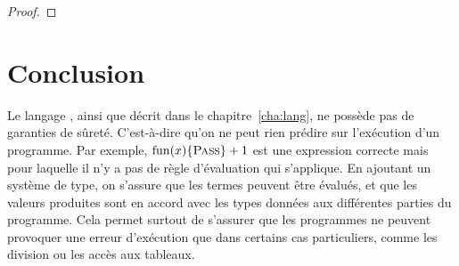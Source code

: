 \begin{proof}
\end{proof}

\section*{Conclusion}

Le langage \langname, ainsi que décrit dans le chapitre~\ref{cha:lang}, ne
possède pas de garanties de sûreté. C'est-à-dire qu'on ne peut rien prédire sur
l'exécution d'un programme. Par exemple, $\mathrm{fun} (x) \{ \textsc{Pass} \} + 1$ est une
expression correcte mais pour laquelle il n'y a pas de règle d'évaluation qui
s'applique. En ajoutant un système de type, on s'assure que les termes peuvent
être évalués, et que les valeurs produites sont en accord avec les types données
aux différentes parties du programme. Cela permet surtout de s'assurer que les
programmes ne peuvent provoquer une erreur d'exécution que dans certains cas
particuliers, comme les division ou les accès aux tableaux.



